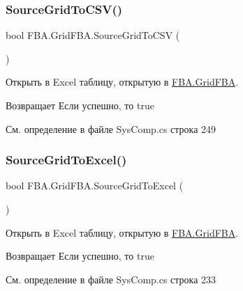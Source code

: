 \subsubsection{\texorpdfstring{Source\+Grid\+To\+C\+S\+V()}{SourceGridToCSV()}}
{\footnotesize\ttfamily bool F\+B\+A.\+Grid\+F\+B\+A.\+Source\+Grid\+To\+C\+SV (\begin{DoxyParamCaption}{ }\end{DoxyParamCaption})}



Открыть в Excel таблицу, открытую в \mbox{\hyperlink{class_f_b_a_1_1_grid_f_b_a}{F\+B\+A.\+Grid\+F\+BA}}. 

\begin{DoxyReturn}{Возвращает}
Если успешно, то true
\end{DoxyReturn}


См. определение в файле Sys\+Comp.\+cs строка 249

\mbox{\label{class_f_b_a_1_1_grid_f_b_a_a46bcb6ce2e842cd06d2798b3b641b078}} 
\subsubsection{\texorpdfstring{Source\+Grid\+To\+Excel()}{SourceGridToExcel()}}
{\footnotesize\ttfamily bool F\+B\+A.\+Grid\+F\+B\+A.\+Source\+Grid\+To\+Excel (\begin{DoxyParamCaption}{ }\end{DoxyParamCaption})}



Открыть в Excel таблицу, открытую в \mbox{\hyperlink{class_f_b_a_1_1_grid_f_b_a}{F\+B\+A.\+Grid\+F\+BA}}. 

\begin{DoxyReturn}{Возвращает}
Если успешно, то true
\end{DoxyReturn}


См. определение в файле Sys\+Comp.\+cs строка 233

\mbox{\label{class_f_b_a_1_1_grid_f_b_a_aac34ab157c27f3f4cb88f542dbf408c9}} 
